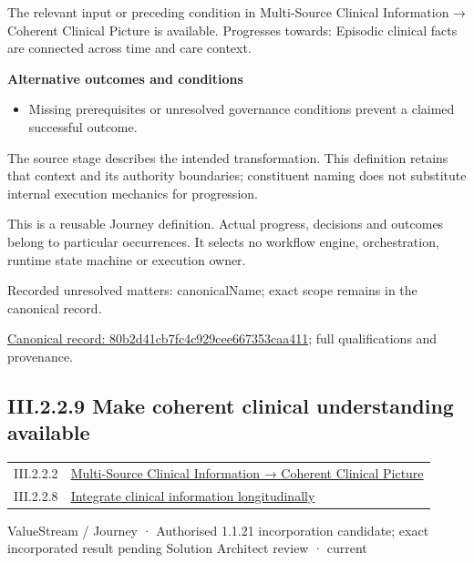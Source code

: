 The relevant input or preceding condition in Multi-Source Clinical Information → Coherent Clinical Picture is available. Progresses towards: Episodic clinical facts are connected across time and care context.



\par\medskip\textbf{Alternative outcomes and conditions}\par


\begin{itemize}


\item Missing prerequisites or unresolved governance conditions prevent a claimed successful outcome.

\end{itemize}


The source stage describes the intended transformation. This definition retains that context and its authority boundaries; constituent naming does not substitute internal execution mechanics for progression.



This is a reusable Journey definition. Actual progress, decisions and outcomes belong to particular occurrences. It selects no workflow engine, orchestration, runtime state machine or execution owner.


{\small Recorded unresolved matters: canonicalName; exact scope remains in the canonical record.}\par
{\footnotesize \href{../../../../continuum/strategy/value-stream/80b2d41cb7fc4c929cee667353caa411.md}{Canonical record: 80b2d41cb7fc4c929cee667353caa411}; full qualifications and provenance.}\par
\subsection*{III.2.2.9 Make coherent clinical understanding available}
\label{navigation:III.2.2.9}

\begin{longtable}{p{.22\linewidth}p{.73\linewidth}}
III.2.2.2 & \hyperref[element:01f655eae3d8485699449c3dcf4f9b56]{Multi-Source Clinical Information → Coherent Clinical Picture} \\
III.2.2.8 & \hyperref[element:80b2d41cb7fc4c929cee667353caa411]{Integrate clinical information longitudinally} \\
\end{longtable}
\label{element:75179fdde77f4c94a47756a7ae109b34}
{\small ValueStream / Journey · Authorised 1.1.21 incorporation candidate; exact incorporated result pending Solution Architect review · current}\par

